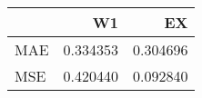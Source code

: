 \begin{tabular}{lrr}
\toprule
{} &        W1 &        EX \\
\midrule
MAE &  0.334353 &  0.304696 \\
MSE &  0.420440 &  0.092840 \\
\bottomrule
\end{tabular}
